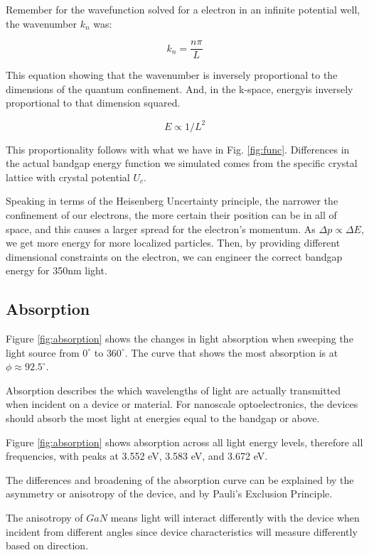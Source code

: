 \documentclass{IEEEtran}
\begin{document}
Remember for the wavefunction solved for a electron in an infinite potential well, the wavenumber \(k_n\) was:

\begin{equation}
    k_n = \frac{n \pi}{L}
\end{equation}

This equation showing that the wavenumber is inversely proportional to the dimensions of the quantum confinement. And, in the k-space, energyis inversely proportional to that dimension squared.

\begin{equation}
    E \propto 1/L^2
\end{equation}

This proportionality follows with what we have in Fig. \ref{fig:func}. Differences in the actual bandgap energy function we simulated comes from the specific crystal lattice with crystal potential \(U_c\).

Speaking in terms of the Heisenberg Uncertainty principle, the narrower the confinement of our electrons, the more certain their position can be in all of space, and this causes a larger spread for the electron's momentum. As \(\Delta p \propto \Delta E\), we get more energy for more localized particles. Then, by providing different dimensional constraints on the electron, we can engineer the correct bandgap energy for 350nm light.

\subsection{Absorption}

Figure \ref{fig:absorption} shows the changes in light absorption when sweeping the light source from \(0^\circ\) to \(360^\circ\). The curve that shows the most absorption is at \(\phi \approx 92.5^\circ\).

Absorption describes the which wavelengths of light are actually transmitted when incident on a device or material. For nanoscale optoelectronics, the devices should absorb the most light at energies equal to the bandgap or above.

Figure \ref{fig:absorption} shows absorption across all light energy levels, therefore all frequencies, with peaks at 3.552 eV, 3.583 eV, and 3.672 eV. 

The differences and broadening of the absorption curve can be explained by the asymmetry or anisotropy of the device, and by Pauli's Exclusion Principle.

The anisotropy of \(GaN\) means light will interact differently with the device when incident from different angles since device characteristics will measure differently based on direction. 
\end{document}
